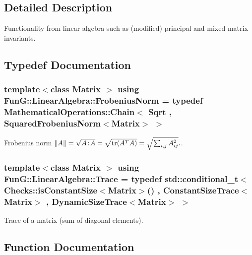 \subsection{Detailed Description}
Functionality from linear algebra such as (modified) principal and mixed matrix invariants. 



\subsection{Typedef Documentation}
\subsubsection[{\texorpdfstring{Frobenius\+Norm}{FrobeniusNorm}}]{\setlength{\rightskip}{0pt plus 5cm}template$<$class Matrix $>$ using {\bf Fun\+G\+::\+Linear\+Algebra\+::\+Frobenius\+Norm} = typedef Mathematical\+Operations\+::\+Chain$<$ Sqrt , Squared\+Frobenius\+Norm$<$Matrix$>$ $>$}\hypertarget{group__LinearAlgebraGroup_gad209833e37a25e863fe72868d37795b8}{}\label{group__LinearAlgebraGroup_gad209833e37a25e863fe72868d37795b8}


Frobenius norm $ \|A\| = \sqrt{A\negthinspace : \negthinspace A }= \sqrt{\mathrm{tr}(A^TA)} = \sqrt{\sum_{i,j} A_{ij}^2}. $. 

\subsubsection[{\texorpdfstring{Trace}{Trace}}]{\setlength{\rightskip}{0pt plus 5cm}template$<$class Matrix $>$ using {\bf Fun\+G\+::\+Linear\+Algebra\+::\+Trace} = typedef std\+::conditional\+\_\+t$<$ Checks\+::is\+Constant\+Size$<$Matrix$>$() , Constant\+Size\+Trace$<$Matrix$>$ , Dynamic\+Size\+Trace$<$Matrix$>$ $>$}\hypertarget{group__LinearAlgebraGroup_ga43e327309edc349c75ceecd29b7abde2}{}\label{group__LinearAlgebraGroup_ga43e327309edc349c75ceecd29b7abde2}


Trace of a matrix (sum of diagonal elements). 



\subsection{Function Documentation}
